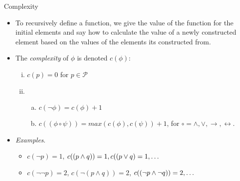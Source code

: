 \documentclass[../slides.tex]{subfiles}
\begin{document}
\begin{frame}{Complexity}

		\begin{itemize}
	
 		\item \alert{To recursively define a function, we give the value of the function for the initial elements and say how to calculate the value of a newly constructed element based on the values of the elements its constructed from.}
		
		\item The \emph{complexity} of $\phi$ is denoted $c(\phi)$:
		 \begin{enumerate}[(i)]
	
		\item $c(p)=0$ for $p\in\mathcal{P}$
		
		\item \begin{enumerate}[(a)]
		
			\item $c(\neg\phi)=c(\phi)+1$
			
			\item $c((\phi\circ\psi))=max(c(\phi), c(\psi))+1$, for $\circ=\land,\lor,\to,\leftrightarrow$.
		
		\end{enumerate}
		\end{enumerate}
		
		
		\item \emph{Examples}.
		
		 \begin{itemize}
	
		\item $c(\neg p)=1$, $c((p\land q))=1, c((p\lor q)=1, \mathellipsis$
		
		\item $c(\neg\neg p)=2$, $c(\neg (p\land q))=2$, $c((\neg p\land \neg q))=2, \mathellipsis$
	
	\end{itemize}
		
		
		\end{itemize}

\end{frame}
\end{document}
